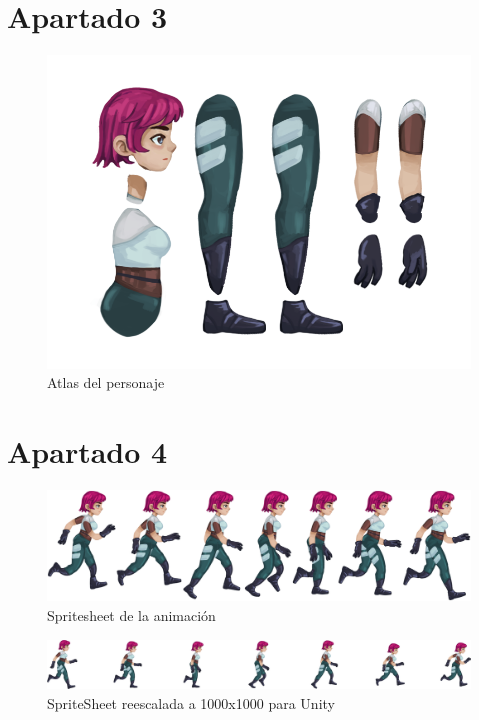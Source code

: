 \documentclass[12pt]{article}
\begin{document}
\section{Apartado 3}
    \begin{figure}[h]
        \centering
        \includegraphics[width=\textwidth]{imgs/2D-Character.png}
        \caption{Atlas del personaje}
        \label{fig:atlas}
    \end{figure}
\newpage
\section{Apartado 4}
    \begin{figure}[h]
        \centering
        \includegraphics[width=\textwidth]{imgs/spritesheet_og.png}
        \caption{Spritesheet de la animación}
        \label{fig:sprt_og}
    \end{figure}
    \begin{figure}[h]
        \centering
        \includegraphics[width=\textwidth]{imgs/spritesheet_res.png}
        \caption{SpriteSheet reescalada a 1000x1000 para Unity}
        \label{fig:sprt_res}
    \end{figure}
\newpage
\end{document}
